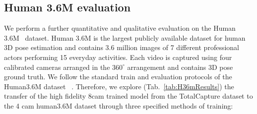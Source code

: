 \documentclass{bmvc2k}
\begin{document}
\subsection{Human 3.6M evaluation}
We perform a further quantitative and qualitative evaluation on the Human 3.6M~\cite{h36m_pami} dataset. Human 3.6M is the largest publicly available dataset for human 3D pose estimation and contains 3.6 million images of 7 different professional actors performing 15 everyday activities. Each video is captured using four calibrated cameras arranged in the $360^\circ$ arrangement and contains 3D pose ground truth. We follow the standard train and evaluation protocols of the Human3.6M dataset ~\cite{li2015maximumH36m,tome2017liftingH36m}.
Therefore, we explore (Tab.~\ref{tab:H36mResults})
the transfer of the high fidelity 8cam trained model from the TotalCapture dataset to the 4 cam human3.6M dataset through three specified methods of training:
\end{document}
